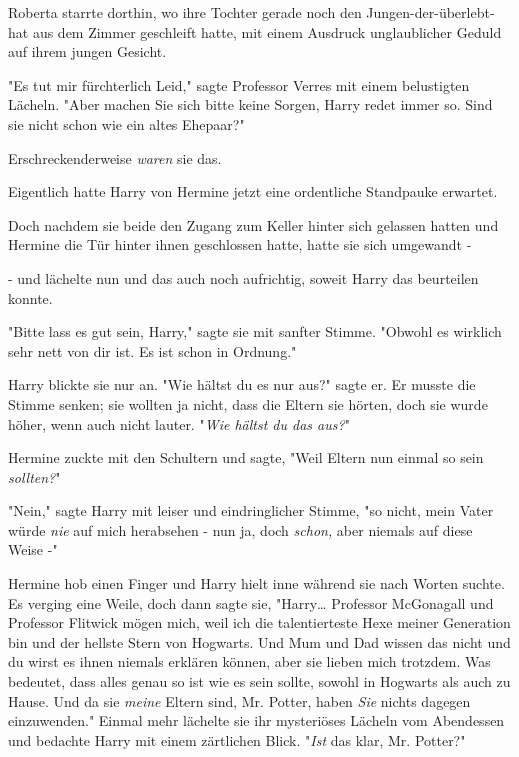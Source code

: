 {\later

Roberta starrte dorthin, wo ihre Tochter gerade noch den Jungen-der-überlebt-hat aus dem Zimmer geschleift hatte, mit einem Ausdruck unglaublicher Geduld auf ihrem jungen Gesicht.

"Es tut mir fürchterlich Leid," sagte Professor Verres mit einem belustigten Lächeln. "Aber machen Sie sich bitte keine Sorgen, Harry redet immer so. Sind sie nicht schon wie ein altes Ehepaar?"

Erschreckenderweise \emph{waren} sie das.

\later

Eigentlich hatte Harry von Hermine jetzt eine ordentliche Standpauke erwartet.

Doch nachdem sie beide den Zugang zum Keller hinter sich gelassen hatten und Hermine die Tür hinter ihnen geschlossen hatte, hatte sie sich umgewandt -

- und lächelte nun und das auch noch aufrichtig, soweit Harry das beurteilen konnte.

"Bitte lass es gut sein, Harry," sagte sie mit sanfter Stimme. "Obwohl es wirklich sehr nett von dir ist. Es ist schon in Ordnung."

Harry blickte sie nur an. "Wie hältst du es nur aus?" sagte er. Er musste die Stimme senken; sie wollten ja nicht, dass die Eltern sie hörten, doch sie wurde höher, wenn auch nicht lauter. "\emph{Wie hältst du das aus?}"

Hermine zuckte mit den Schultern und sagte, "Weil Eltern nun einmal so sein \emph{sollten?}"

"Nein," sagte Harry mit leiser und eindringlicher Stimme, "so nicht, mein Vater würde \emph{nie} auf mich herabsehen - nun ja, doch \emph{schon,} aber niemals auf diese Weise -"

Hermine hob einen Finger und Harry hielt inne während sie nach Worten suchte. Es verging eine Weile, doch dann sagte sie, "Harry… Professor McGonagall und Professor Flitwick mögen mich, weil ich die talentierteste Hexe meiner Generation bin und der hellste Stern von Hogwarts. Und Mum und Dad wissen das nicht und du wirst es ihnen niemals erklären können, aber sie lieben mich trotzdem. Was bedeutet, dass alles genau so ist wie es sein sollte, sowohl in Hogwarts als auch zu Hause. Und da sie \emph{meine} Eltern sind, Mr. Potter, haben \emph{Sie} nichts dagegen einzuwenden." Einmal mehr lächelte sie ihr mysteriöses Lächeln vom Abendessen und bedachte Harry mit einem zärtlichen Blick. "\emph{Ist} das klar, Mr. Potter?"

}
